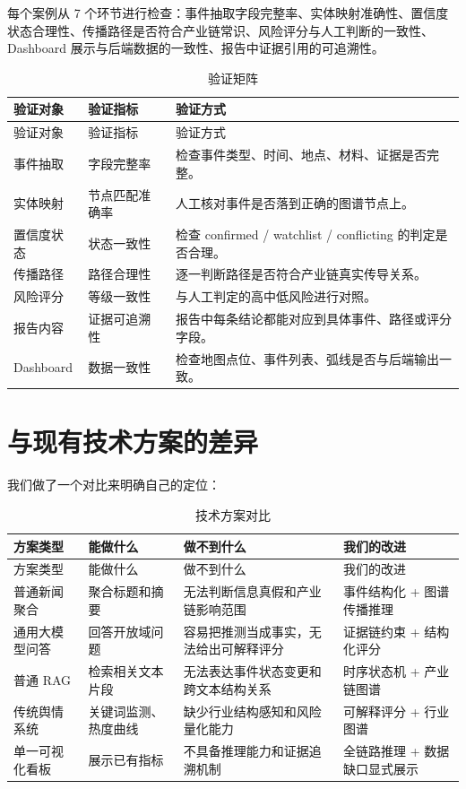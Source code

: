 \documentclass[12pt,a4paper]{ctexart}
\begin{document}
每个案例从 7 个环节进行检查：事件抽取字段完整率、实体映射准确性、置信度状态合理性、传播路径是否符合产业链常识、风险评分与人工判断的一致性、Dashboard 展示与后端数据的一致性、报告中证据引用的可追溯性。

\begin{longtable}{p{2.4cm}p{3.5cm}p{7.0cm}}
\caption{验证矩阵}\label{tab:evaluation}\\
\toprule
验证对象 & 验证指标 & 验证方式 \\
\midrule
\endfirsthead
\toprule
验证对象 & 验证指标 & 验证方式 \\
\midrule
\endhead
事件抽取 & 字段完整率 & 检查事件类型、时间、地点、材料、证据是否完整。 \\
实体映射 & 节点匹配准确率 & 人工核对事件是否落到正确的图谱节点上。 \\
置信度状态 & 状态一致性 & 检查 confirmed / watchlist / conflicting 的判定是否合理。 \\
传播路径 & 路径合理性 & 逐一判断路径是否符合产业链真实传导关系。 \\
风险评分 & 等级一致性 & 与人工判定的高中低风险进行对照。 \\
报告内容 & 证据可追溯性 & 报告中每条结论都能对应到具体事件、路径或评分字段。 \\
Dashboard & 数据一致性 & 检查地图点位、事件列表、弧线是否与后端输出一致。 \\
\bottomrule
\end{longtable}

\section{与现有技术方案的差异}

我们做了一个对比来明确自己的定位：

\begin{longtable}{p{3.0cm}p{3.2cm}p{3.6cm}p{3.8cm}}
\caption{技术方案对比}\label{tab:comparison}\\
\toprule
方案类型 & 能做什么 & 做不到什么 & 我们的改进 \\
\midrule
\endfirsthead
\toprule
方案类型 & 能做什么 & 做不到什么 & 我们的改进 \\
\midrule
\endhead
普通新闻聚合 & 聚合标题和摘要 & 无法判断信息真假和产业链影响范围 & 事件结构化 + 图谱传播推理 \\
通用大模型问答 & 回答开放域问题 & 容易把推测当成事实，无法给出可解释评分 & 证据链约束 + 结构化评分 \\
普通 RAG & 检索相关文本片段 & 无法表达事件状态变更和跨文本结构关系 & 时序状态机 + 产业链图谱 \\
传统舆情系统 & 关键词监测、热度曲线 & 缺少行业结构感知和风险量化能力 & 可解释评分 + 行业图谱 \\
单一可视化看板 & 展示已有指标 & 不具备推理能力和证据追溯机制 & 全链路推理 + 数据缺口显式展示 \\
\bottomrule
\end{longtable}
\end{document}
